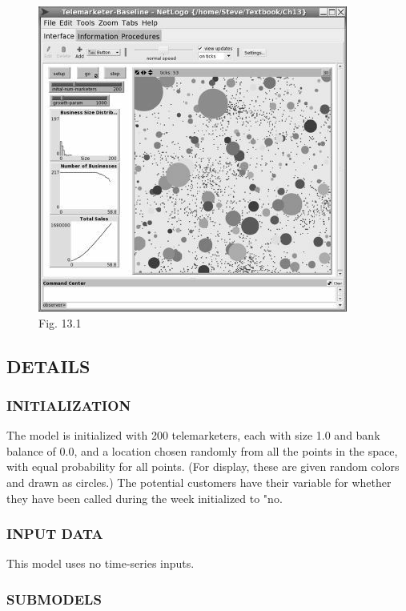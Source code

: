 \documentclass[]{article}
\begin{document}
\begin{figure}
\centering
\includegraphics{fig_13_1.jpg}
\caption{Fig. 13.1}
\end{figure}

\hypertarget{details}{%
\subsection{DETAILS}\label{details}}

\hypertarget{initialization}{%
\subsubsection{INITIALIZATION}\label{initialization}}

The model is initialized with 200 telemarketers, each with size 1.0 and
bank balance of 0.0, and a location chosen randomly from all the points
in the space, with equal probability for all points. (For display, these
are given random colors and drawn as circles.) The potential customers
have their variable for whether they have been called during the week
initialized to "no.

\hypertarget{input-data}{%
\subsubsection{INPUT DATA}\label{input-data}}

This model uses no time-series inputs.

\hypertarget{submodels}{%
\subsubsection{SUBMODELS}\label{submodels}}
\end{document}
